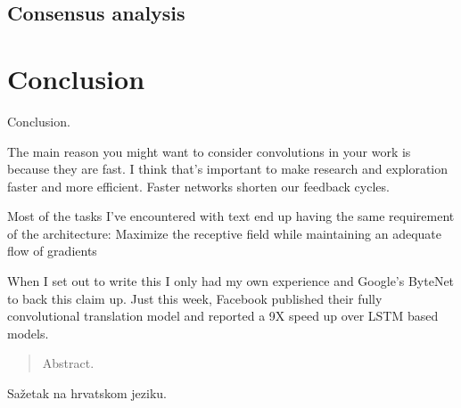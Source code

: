 \documentclass[times, utf8, diplomski, numeric, english]{fer}
\begin{document}
\section{Consensus analysis}

\chapter{Conclusion}
Conclusion.

The main reason you might want to consider convolutions in your work is because they are fast. I think that’s important to make research and exploration faster and more efficient. Faster networks shorten our feedback cycles.

Most of the tasks I’ve encountered with text end up having the same requirement of the architecture: Maximize the receptive field while maintaining an adequate flow of gradients

When I set out to write this I only had my own experience and Google’s ByteNet to back this claim up. Just this week, Facebook published their fully convolutional translation model and reported a 9X speed up over LSTM based models.





\begin{abstract}
Abstract.

\end{abstract}

\begin{sazetak}
Sažetak na hrvatskom jeziku.

\end{sazetak}
\end{document}
